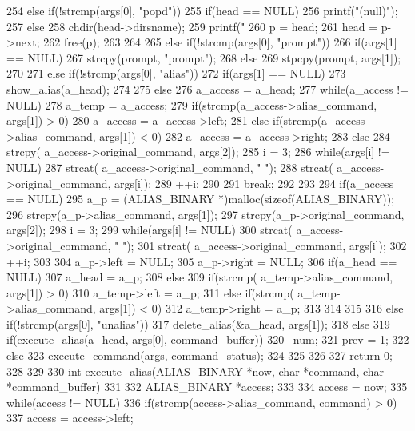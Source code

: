 \documentclass{procreport}
\begin{document}
\begin{verbatimtab}
{{{   254			}else if(!strcmp(args[0], "popd")){
   255				if(head == NULL)
   256					printf("(null)\n");
   257				else{
   258					chdir(head->dirsname);
   259					printf("%
   260					p = head;
   261					head = p->next;
   262					free(p);
   263				}
   264	
   265			}else if(!strcmp(args[0], "prompt")){
   266				if(args[1] == NULL)
   267					strcpy(prompt, "prompt");
   268				else
   269					stpcpy(prompt, args[1]);
   270				
   271			}else if(!strcmp(args[0], "alias")){
   272				if(args[1] == NULL){
   273					show_alias(a_head);
   274				}
   275				else{
   276					a_access = a_head;
   277					while(a_access != NULL){
   278						a_temp = a_access;
   279						if(strcmp(a_access->alias_command, 
args[1]) > 0)
   280							a_access = a_access->left;
   281						else if(strcmp(a_access->alias_command, 
args[1]) < 0)
   282							a_access = a_access->right;
   283						else{
   284							strcpy(
a_access->original_command, args[2]);
   285							i = 3;
   286							while(args[i] != NULL){
   287								strcat(
a_access->original_command, " ");
   288								strcat(
a_access->original_command, args[i]);
   289								++i;
   290							}
   291							break;
   292						}
   293					}
   294					if(a_access == NULL){
   295						a_p = 
(ALIAS_BINARY *)malloc(sizeof(ALIAS_BINARY));
   296						strcpy(a_p->alias_command, args[1]);
   297						strcpy(a_p->original_command, args[2]);
   298						i = 3;
   299						while(args[i] != NULL){
   300							strcat(
a_access->original_command, " ");
   301							strcat(
a_access->original_command, args[i]);
   302							++i;
   303						}
   304						a_p->left = NULL;
   305						a_p->right = NULL;
   306						if(a_head == NULL)
   307							a_head = a_p;
   308						else{
   309							if(strcmp(
a_temp->alias_command, args[1]) > 0)
   310								a_temp->left = a_p;
   311							else if(strcmp(
a_temp->alias_command, args[1]) < 0)
   312								a_temp->right = a_p;
   313						}
   314					}
   315				}
   316			}else if(!strcmp(args[0], "unalias")){
   317				delete_alias(&a_head, args[1]);
   318			}else{
   319				if(execute_alias(a_head, args[0], command_buffer)){
   320					--num;
   321					prev = 1;
   322				}else
   323					execute_command(args, command_status);
   324			}
   325		}
   326	
   327		return 0;
   328	}
   329	
   330	int execute_alias(ALIAS_BINARY *now, char *command, char *command_buffer)
   331	{
   332		ALIAS_BINARY *access;
   333		
   334		access = now;
   335		while(access != NULL){
   336			if(strcmp(access->alias_command, command) > 0){
   337				access = access->left;
}}}
\end{verbatimtab}
\end{document}
